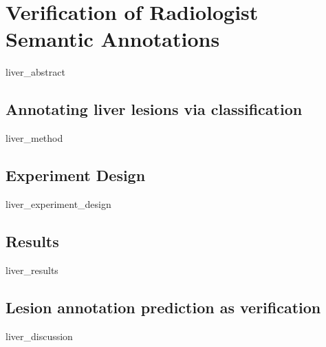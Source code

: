 \chapter{Verification of Radiologist Semantic Annotations}
{liver_abstract}

\section{Annotating liver lesions via classification}
{liver_method}
\clearpage

\section{Experiment Design}
{liver_experiment_design}
\clearpage

\section{Results}
{liver_results}
\clearpage

\section{Lesion annotation prediction as verification}
{liver_discussion}